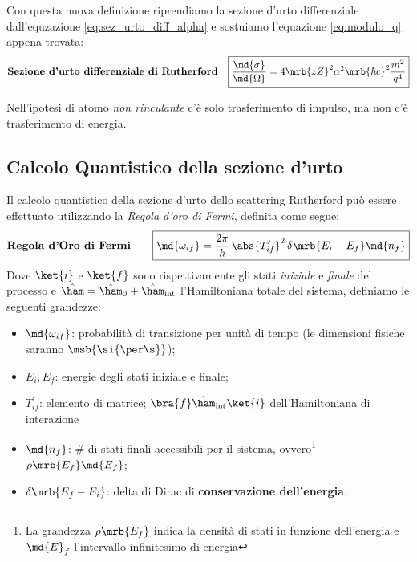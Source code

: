 Con questa nuova definizione riprendiamo la sezione d'urto differenziale
dall'equzazione \ref{eq:sez_urto_diff_alpha} e sostuiamo l'equazione
\ref{eq:modulo_q} appena trovata:
\begin{align}
	\textbf{Sezione d'urto differenziale di Rutherford} &  &
	\boxed{
		\frac{\md{\sigma}}{\md{\Omega}} = 4\mrb{zZ}^2 \alpha^2 \mrb{\hbar c}^2
		\frac{m^2}{q^4}
	}
	\label{eq:sezione_urto_differenziale_rutherford}
\end{align}

\begin{note}[]
	Nell'ipotesi di atomo \textit{non rinculante} c'è solo trasferimento di
	impulso, ma non c'è trasferimento di energia.
\end{note}

\subsection{Calcolo Quantistico della sezione d'urto}
Il calcolo quantistico della sezione d'urto dello scattering Rutherford può
essere effettuato utilizzando la \textit{Regola d'oro di Fermi}, definita come
segue:
\begin{align}
	\textbf{Regola d'Oro di Fermi} \qquad
	\boxed{
		\md{\omega_{if}} = \frac{2\pi}{\hbar} \, \abs{T_{if}^\prime}^2 \,
		\delta\mrb{E_i-E_f} \md{n_f}
	}
	\label{eq:regola_oro_fermi}
\end{align}
Dove $\ket{i}$ e $\ket{f}$ sono rispettivamente gli stati \textit{iniziale} e
\textit{finale} del processo e $\hat{\ham} = \hat{\ham}_{0} +
	\hat{\ham}_{\text{int}}$ l'Hamiltoniana totale del sistema, definiamo le
seguenti grandezze:
\begin{itemize}
	\item $\md{\omega_{if}}$: probabilità di transizione per unità di tempo (le
	      dimensioni fisiche saranno $\msb{\si{\per \s}}$);
	\item $E_i,E_f$: energie degli stati iniziale e finale;
	\item $T_{if}^\prime$: elemento di matrice;
	      $\bra{f}\hat{\ham}_{\text{int}}\ket{i}$ dell'Hamiltoniana di interazione
	\item $\md{n_f}$: \# di stati finali accessibili per il sistema,
	      ovvero\footnote{
		      La grandezza $\rho\mrb{E_f}$ indica la densità di stati in funzione
		      dell'energia e $\md{E}_{f}$ l'intervallo infinitesimo di energia
	      } $\rho\mrb{E_f} \md{E_f}$;
	\item $\delta\mrb{E_f - E_i}$: delta di Dirac di \textbf{conservazione
		      dell'energia}.
\end{itemize}

